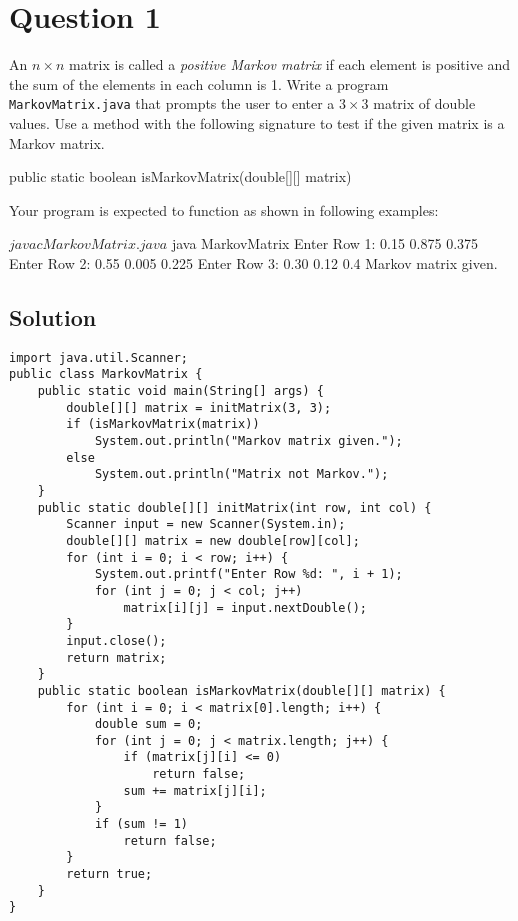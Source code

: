\documentclass[12pt,letterpaper,twoside]{article}
\begin{document}


\section*{Question 1}

An $n \times n$ matrix is called a \textit{positive Markov matrix} if each element is positive and the sum of the elements in each column is 1.
Write a program \texttt{MarkovMatrix.java} that prompts the user to enter a $3 \times 3$ matrix of double values.
Use a method with the following signature to test if the given matrix is a Markov matrix.

\begin{terminal}
public static boolean isMarkovMatrix(double[][] matrix)
\end{terminal}

Your program is expected to function as shown in following examples:

\begin{terminal}
$ javac MarkovMatrix.java
$ java MarkovMatrix
Enter Row 1: 0.15 0.875 0.375
Enter Row 2: 0.55 0.005 0.225
Enter Row 3: 0.30 0.12 0.4
Markov matrix given.
\end{terminal}

\newpage

\subsection*{Solution}

\lstset{language=Java,tabsize=4}
\begin{lstlisting}
import java.util.Scanner;
public class MarkovMatrix {
	public static void main(String[] args) {
		double[][] matrix = initMatrix(3, 3);
		if (isMarkovMatrix(matrix))
			System.out.println("Markov matrix given.");
		else
			System.out.println("Matrix not Markov.");
	}
	public static double[][] initMatrix(int row, int col) {
		Scanner input = new Scanner(System.in);
		double[][] matrix = new double[row][col];
		for (int i = 0; i < row; i++) {
			System.out.printf("Enter Row %d: ", i + 1);
			for (int j = 0; j < col; j++)
				matrix[i][j] = input.nextDouble();
		}
		input.close();
		return matrix;
	}
	public static boolean isMarkovMatrix(double[][] matrix) {
		for (int i = 0; i < matrix[0].length; i++) {
			double sum = 0;
			for (int j = 0; j < matrix.length; j++) {
				if (matrix[j][i] <= 0)
					return false;
				sum += matrix[j][i];
			}
			if (sum != 1)
				return false;
		}
		return true;
	}
}
\end{lstlisting}
\end{document}
